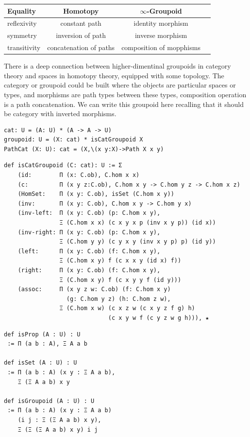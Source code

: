 \documentclass{article}
\theoremstyle{definition}
\begin{document}
\begin{table}[H]
\begin{center}
\begin{tabular}{lccc}
\hline
{\bf Equality} & {\bf Homotopy} & {\bf $\infty$-Groupoid} \\
\hline
reflexivity  & constant path & identity morphism \\
symmetry     & inversion of path & inverse morphism \\
transitivity & concatenation of paths & composition of mopphisms \\
\hline
\end{tabular}
\end{center}
\end{table}

There is a deep connection between higher-dimentinal groupoids in category theory and
spaces in homotopy theory, equipped with some topology. The category or groupoid could
be built where the objects are particular spaces or types, and morphisms are path types
between these types, composition operation is a path concatenation. We can write this
groupoid here recalling that it should be category with inverted morphisms.

\begin{lstlisting}
cat: U = (A: U) * (A -> A -> U)
groupoid: U = (X: cat) * isCatGroupoid X
PathCat (X: U): cat = (X,\(x y:X)->Path X x y)
\end{lstlisting}

\begin{lstlisting}
def isCatGroupoid (C: cat): U := Σ
    (id:        Π (x: C.ob), C.hom x x)
    (c:         Π (x y z:C.ob), C.hom x y -> C.hom y z -> C.hom x z)
    (HomSet:    Π (x y: C.ob), isSet (C.hom x y))
    (inv:       Π (x y: C.ob), C.hom x y -> C.hom y x)
    (inv-left:  Π (x y: C.ob) (p: C.hom x y),
                Ξ (C.hom x x) (c x y x p (inv x y p)) (id x))
    (inv-right: Π (x y: C.ob) (p: C.hom x y),
                Ξ (C.hom y y) (c y x y (inv x y p) p) (id y))
    (left:      Π (x y: C.ob) (f: C.hom x y),
                Ξ (C.hom x y) f (c x x y (id x) f))
    (right:     Π (x y: C.ob) (f: C.hom x y),
                Ξ (C.hom x y) f (c x y y f (id y)))
    (assoc:     Π (x y z w: C.ob) (f: C.hom x y)
                  (g: C.hom y z) (h: C.hom z w),
                Ξ (C.hom x w) (c x z w (c x y z f g) h)
                              (c x y w f (c y z w g h))), ★
\end{lstlisting}

\newpage
\begin{lstlisting}
def isProp (A : U) : U
 := Π (a b : A), Ξ A a b

def isSet (A : U) : U
 := Π (a b : A) (x y : Ξ A a b),
    Ξ (Ξ A a b) x y

def isGroupoid (A : U) : U
 := Π (a b : A) (x y : Ξ A a b)
    (i j : Ξ (Ξ A a b) x y),
    Ξ (Ξ (Ξ A a b) x y) i j
\end{lstlisting}
\end{document}
